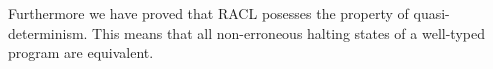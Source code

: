 Furthermore we have proved that RACL posesses the property of quasi-determinism.
This means that all non-erroneous halting states of a well-typed program are
equivalent.

%
%

